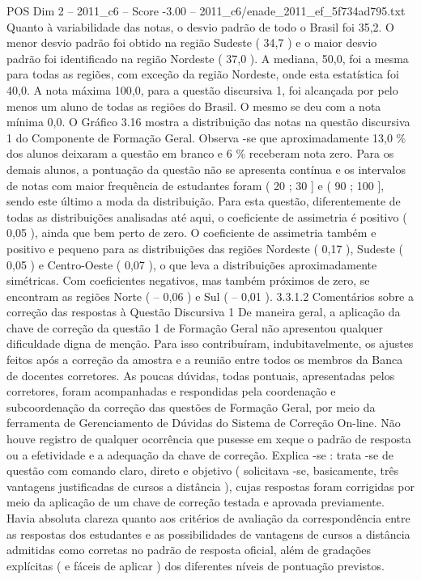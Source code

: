 \begin{textsample}{POS Dim 2 – 2011\_c6 – Score -3.00 – 2011\_c6/enade\_2011\_ef\_5f734ad795.txt}
Quanto à variabilidade das notas, o desvio padrão de todo o Brasil foi 35,2.
O menor desvio padrão foi obtido na região Sudeste ( 34,7 ) e o maior desvio padrão foi identificado na região Nordeste ( 37,0 ).
A mediana, 50,0, foi a mesma para todas as regiões, com exceção da região Nordeste, onde esta estatística foi 40,0.
A nota máxima 100,0, para a questão discursiva 1, foi alcançada por pelo menos um aluno de todas as regiões do Brasil.
O mesmo se deu com a nota mínima 0,0.
O Gráfico 3.16 mostra a distribuição das notas na questão discursiva 1 do Componente de Formação Geral.
Observa -se que aproximadamente 13,0 \% dos alunos deixaram a questão em branco e 6 \% receberam nota zero.
Para os demais alunos, a pontuação da questão não se apresenta contínua e os intervalos de notas com maior frequência de estudantes foram ( 20 ; 30 ] e ( 90 ; 100 ], sendo este último a moda da distribuição.
Para esta questão, diferentemente de todas as distribuições analisadas até aqui, o coeficiente de assimetria é positivo ( 0,05 ), ainda que bem perto de zero.
O coeficiente de assimetria também e positivo e pequeno para as distribuições das regiões Nordeste ( 0,17 ), Sudeste ( 0,05 ) e Centro-Oeste ( 0,07 ), o que leva a distribuições aproximadamente simétricas.
Com coeficientes negativos, mas também próximos de zero, se encontram as regiões Norte ( – 0,06 ) e Sul ( – 0,01 ). 3.3.1.2 Comentários sobre a correção das respostas à Questão Discursiva 1 De maneira geral, a aplicação da chave de correção da questão 1 de Formação Geral não apresentou qualquer dificuldade digna de menção.
Para isso contribuíram, indubitavelmente, os ajustes feitos após a correção da amostra e a reunião entre todos os membros da Banca de docentes corretores.
As poucas dúvidas, todas pontuais, apresentadas pelos corretores, foram acompanhadas e respondidas pela coordenação e subcoordenação da correção das questões de Formação Geral, por meio da ferramenta de Gerenciamento de Dúvidas do Sistema de Correção On-line.
Não houve registro de qualquer ocorrência que pusesse em xeque o padrão de resposta ou a efetividade e a adequação da chave de correção.
Explica -se : trata -se de questão com comando claro, direto e objetivo ( solicitava -se, basicamente, três vantagens justificadas de cursos a distância ), cujas respostas foram corrigidas por meio da aplicação de um chave de correção testada e aprovada previamente.
Havia absoluta clareza quanto aos critérios de avaliação da correspondência entre as respostas dos estudantes e as possibilidades de vantagens de cursos a distância admitidas como corretas no padrão de resposta oficial, além de gradações explícitas ( e fáceis de aplicar ) dos diferentes níveis de pontuação previstos.

\end{textsample}
